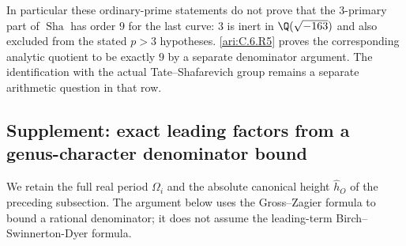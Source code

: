 In particular these ordinary-prime statements do not prove that
the $3$-primary part of $\operatorname{Sha}$ has order $9$ for the
last curve: $3$ is inert in $\Q(\sqrt{-163})$ and also excluded
from the stated $p>3$ hypotheses. \ref{ari:C.6.R5} proves the corresponding
analytic quotient to be exactly $9$ by a separate denominator
argument. The identification with the actual Tate--Shafarevich
group remains a separate arithmetic question in that row.


\subsection{Supplement: exact leading factors from a genus-character denominator bound}

We retain the full real period $\Omega_i$ and the absolute canonical
height $\widehat h_O$ of the preceding subsection. The argument below
uses the Gross--Zagier formula to bound a rational denominator; it does
not assume the leading-term Birch--Swinnerton-Dyer formula.

